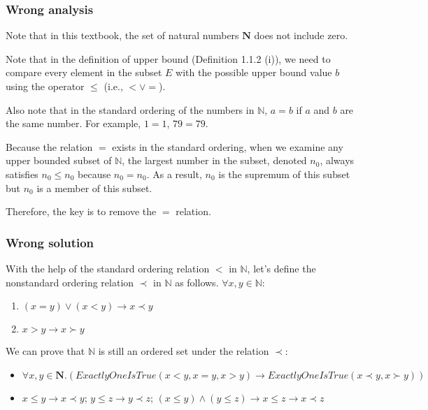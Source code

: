 \documentclass[12pt, letterpaper, oneside]{book}
\begin{document}
\subsubsection{Wrong analysis}

Note that in this textbook, the set of natural numbers $\mathbf{N}$ does not include zero.

Note that in the definition of upper bound (Definition 1.1.2 (i)), we need to compare every element in the subset $E$
with the possible upper bound value $b$ using the operator $\le$ (i.e., $< \lor =$).

Also note that in the standard ordering of the numbers in $\mathbb{N}$, $a = b$ if $a$ and $b$ are the same number. For
example, $1 = 1$, $79 = 79$.

Because the relation $=$ exists in the standard ordering, when we examine any upper bounded subset of $\mathbb{N}$, the
largest number in the subset, denoted $n_0$, always satisfies $n_0 \le n_0$ because $n_0 = n_0$. As a result, $n_0$ is
the supremum of this subset but $n_0$ is a member of this subset.

Therefore, the key is to remove the $=$ relation.

\subsubsection{Wrong solution}

With the help of the standard ordering relation $<$ in $\mathbb{N}$, let's define the nonstandard ordering relation
$\prec$ in $\mathbb{N}$ as follows. $\forall x, y \in \mathbb{N}$:
\begin{enumerate}
  \item $(x = y) \lor (x < y) \rightarrow x \prec y$
  \item $x > y \rightarrow x \succ y$
\end{enumerate}

We can prove that $\mathbb{N}$ is still an ordered set under the relation $\prec$:
\begin{itemize}
  \item $\forall x, y \in \mathbf{N}. (ExactlyOneIsTrue(x < y, x = y, x > y) \rightarrow ExactlyOneIsTrue(x \prec y, x \succ y))$
  \item $x \le y \rightarrow x \prec y$; $y \le z \rightarrow y \prec z$; $(x \le y) \land (y \le z) \rightarrow x \le z \rightarrow x \prec z$
\end{itemize}
\end{document}
